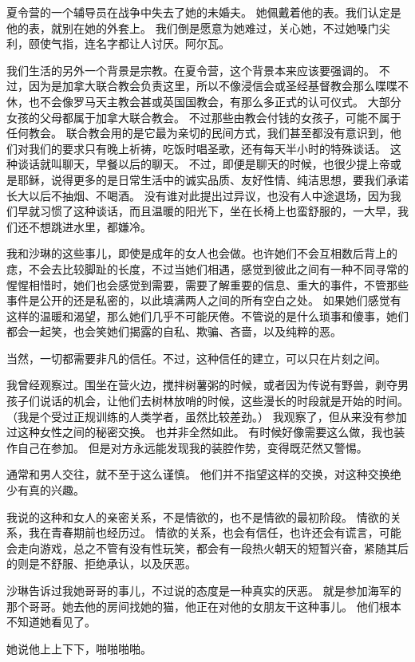 \documentclass[UTF8]{ctexart}
\begin{document}
夏令营的一个辅导员在战争中失去了她的未婚夫。
她佩戴着他的表。我们认定是他的表，就别在她的外套上。
我们倒是愿意为她难过，关心她，不过她嗓门尖利，颐使气指，连名字都让人讨厌。阿尔瓦。

我们生活的另外一个背景是宗教。在夏令营，这个背景本来应该要强调的。
不过，因为是加拿大联合教会负责这里，所以不像浸信会或圣经基督教会那么喋喋不休，也不会像罗马天主教会甚或英国国教会，有那么多正式的认可仪式。
大部分女孩的父母都属于加拿大联合教会。
不过那些由教会付钱的女孩子，可能不属于任何教会。
联合教会用的是它最为亲切的民间方式，我们甚至都没有意识到，他们对我们的要求只有晚上祈祷，吃饭时唱圣歌，还有每天半小时的特殊谈话。
这种谈话就叫聊天，早餐以后的聊天。
不过，即便是聊天的时候，也很少提上帝或是耶稣，说得更多的是日常生活中的诚实品质、友好性情、纯洁思想，要我们承诺长大以后不抽烟、不喝酒。
没有谁对此提出过异议，也没有人中途退场，因为我们早就习惯了这种谈话，而且温暖的阳光下，坐在长椅上也蛮舒服的，一大早，我们还不想跳进水里，都嫌冷。

我和沙琳的这些事儿，即使是成年的女人也会做。也许她们不会互相数后背上的痣，不会去比较脚趾的长度，不过当她们相遇，感觉到彼此之间有一种不同寻常的惺惺相惜时，她们也会感觉到需要，需要了解重要的信息、重大的事件，不管那些事件是公开的还是私密的，以此填满两人之间的所有空白之处。
如果她们感觉有这样的温暖和渴望，那么她们几乎不可能厌倦。不管说的是什么琐事和傻事，她们都会一起笑，也会笑她们揭露的自私、欺骗、吝啬，以及纯粹的恶。

当然，一切都需要非凡的信任。不过，这种信任的建立，可以只在片刻之间。

我曾经观察过。围坐在营火边，搅拌树薯粥的时候，或者因为传说有野兽，剥夺男孩子们说话的机会，让他们去树林放哨的时候，这些漫长的时段就是开始的时间。
（我是个受过正规训练的人类学者，虽然比较差劲。）
我观察了，但从来没有参加过这种女性之间的秘密交换。
也并非全然如此。
有时候好像需要这么做，我也装作自己在参加。
但是对方永远能发现我的装腔作势，变得既茫然又警惕。

通常和男人交往，就不至于这么谨慎。
他们并不指望这样的交换，对这种交换绝少有真的兴趣。

我说的这种和女人的亲密关系，不是情欲的，也不是情欲的最初阶段。
情欲的关系，我在青春期前也经历过。
情欲的关系，也会有信任，也许还会有谎言，可能会走向游戏，总之不管有没有性玩笑，都会有一段热火朝天的短暂兴奋，紧随其后的则是不舒服、拒绝承认，以及厌恶。

沙琳告诉过我她哥哥的事儿，不过说的态度是一种真实的厌恶。
就是参加海军的那个哥哥。她去他的房间找她的猫，他正在对他的女朋友干这种事儿。
他们根本不知道她看见了。

她说他上上下下，啪啪啪啪。
\end{document}
